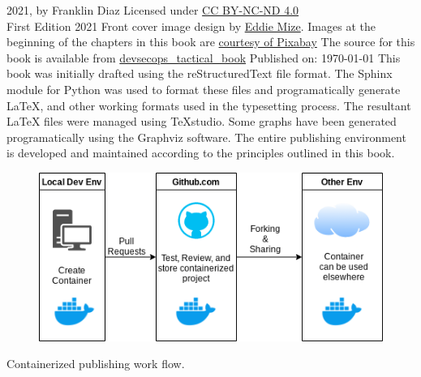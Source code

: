 \justify{}
\textcopyright{} 2021, by Franklin Diaz
\justify{}
Licensed under \href{https://creativecommons.org/licenses/by-nc-nd/4.0/}{CC BY-NC-ND 4.0} 
\faCreativeCommons\ \faCreativeCommonsBy\ \faCreativeCommonsSa
\vspace{5mm}\\
First Edition 2021
\justify{}
Front cover image design by {\href{https://www.linkedin.com/in/eddiemize/}{Eddie Mize}}.
Images at the beginning of the chapters in this book are
\href{https://pixabay.com/service/terms/#license}{courtesy of Pixabay}
\justify{}
The source for this book is available from 
{\href{https://github.com/thedevilsvoice/devsecops\_tactical\_book}{devsecops\_tactical\_book}}
\vspace{3mm}
Published on: \today
\justify{}
This book was initially drafted using the reStructuredText file format.
The Sphinx module for Python was used to format these files and programatically
generate LaTeX, and other working formats used in the typesetting process. The
resultant LaTeX files were managed using TeXstudio.
\justify{}
Some graphs have been generated programatically using the Graphviz software.
The entire publishing environment is developed and maintained according
to the principles outlined in this book.
\vspace{5mm}
\centering
\vspace{0mm}
\begin{figure}[!htb]
	\centering
	\includegraphics[scale=0.75]{../images/workflow.png}
\end{figure}
\vspace{2mm}
Containerized publishing work flow.
